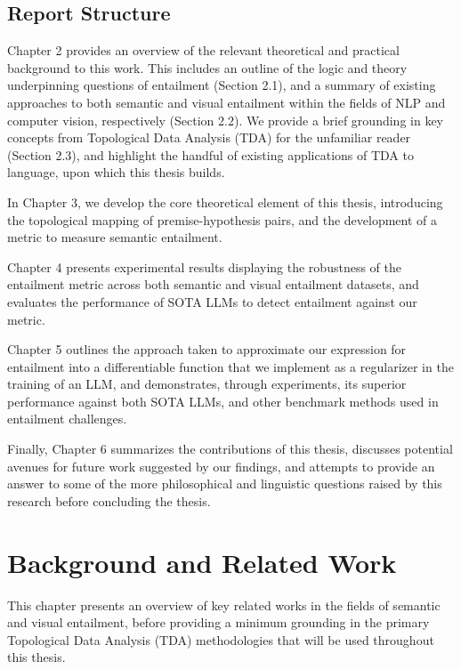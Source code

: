 \documentclass[12pt,twoside]{report}
\begin{document}
\section{Report Structure}
Chapter 2 provides an overview of the relevant theoretical and practical background to this work. This includes an outline of the logic and theory underpinning questions of entailment (Section 2.1), and a summary of existing approaches to both semantic and visual entailment within the fields of NLP and computer vision, respectively (Section 2.2). We provide a brief grounding in key concepts from Topological Data Analysis (TDA) for the unfamiliar reader (Section 2.3), and highlight the handful of existing applications of TDA to language, upon which this thesis builds. \par   \quad In Chapter 3, we develop the core theoretical element of this thesis, introducing the topological mapping of premise-hypothesis pairs, and the development of a metric to measure semantic entailment. \par 
\quad Chapter 4 presents experimental results displaying the robustness of the entailment metric across both semantic and visual entailment datasets, and evaluates the performance of SOTA LLMs to detect entailment against our metric. \par
\quad Chapter 5 outlines the approach taken to approximate our expression for entailment into a differentiable function that we implement as a regularizer in the training of an LLM, and demonstrates, through experiments, its superior performance against both SOTA LLMs, and other benchmark methods used in entailment challenges. \par
\quad Finally, Chapter 6 summarizes the contributions of this thesis, discusses potential avenues for future work suggested by our findings, and attempts to provide an answer to some of the more philosophical and linguistic questions raised by this research before concluding the thesis.




\chapter{Background and Related Work}
This chapter presents an overview of key related works in the fields of semantic and visual entailment, before providing a minimum grounding in the primary Topological Data Analysis (TDA) methodologies that will be used throughout this thesis. \newline \par
\end{document}
